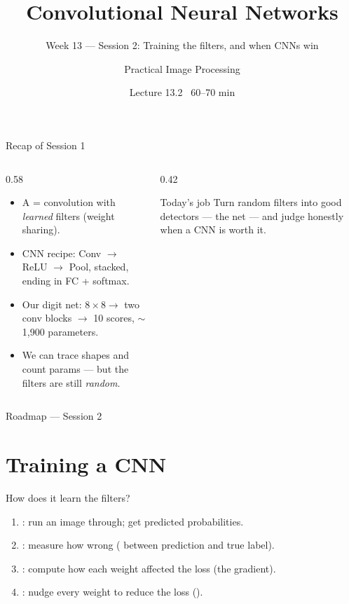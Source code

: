 \documentclass[10pt,aspectratio=169]{beamer}
\title{Convolutional Neural Networks}
\subtitle{Week 13 — Session 2: Training the filters, and when CNNs win}
\author{Practical Image Processing}
\date{Lecture 13.2 \textbullet\ 60--70 min}
\begin{document}
\maketitle

\begin{frame}{Recap of Session 1}
  \begin{columns}[T]
    \begin{column}{0.58\textwidth}
      \begin{itemize}
        \item A  = convolution with \emph{learned} filters (weight sharing).
        \item CNN recipe: Conv $\rightarrow$ ReLU $\rightarrow$ Pool, stacked, ending in FC + softmax.
        \item Our digit net: $8\times8 \rightarrow$ two conv blocks $\rightarrow$ 10 scores, $\sim$1{,}900 parameters.
        \item We can trace shapes and count params --- but the filters are still \emph{random}.
      \end{itemize}
    \end{column}
    \begin{column}{0.42\textwidth}
      \begin{alertblock}{Today's job}
        Turn random filters into good detectors ---  the net --- and judge honestly when a CNN is worth it.
      \end{alertblock}
    \end{column}
  \end{columns}
\end{frame}

\begin{frame}{Roadmap --- Session 2}\tableofcontents\end{frame}

\section{Training a CNN}

\begin{frame}{How does it learn the filters?}
  \begin{enumerate}
    \item {}: run an image through; get predicted probabilities.
    \item {}: measure how wrong ( between prediction and true label).
    \item {}: compute how each weight affected the loss (the gradient).
    \item {}: nudge every weight to reduce the loss ().
  \end{enumerate}
\end{frame}
\end{document}
